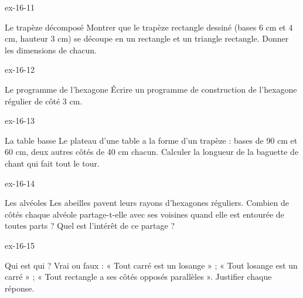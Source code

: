 \begin{blocLivre}{ex-16-11}\begin{exercice}[3]{Le trapèze décomposé}
Montrer que le trapèze rectangle dessiné (bases 6 cm et 4 cm, hauteur 3 cm) se découpe en un rectangle et un triangle rectangle. Donner les dimensions de chacun.
\label{fig-ex-16-11}
\end{exercice}\end{blocLivre}
\begin{blocLivre}{ex-16-12}\begin{exercice}[3]{Le programme de l’hexagone}
Écrire un programme de construction de l’hexagone régulier de côté 3 cm.
\label{fig-ex-16-12}
\end{exercice}\end{blocLivre}
\begin{blocLivre}{ex-16-13}\begin{exercice}[3]{La table basse}
Le plateau d’une table a la forme d’un trapèze : bases de 90 cm et 60 cm, deux autres côtés de 40 cm chacun. Calculer la longueur de la baguette de chant qui fait tout le tour.
\label{fig-ex-16-13}
\end{exercice}\end{blocLivre}
\begin{blocLivre}{ex-16-14}\begin{exercice}[3]{Les alvéoles}
Les abeilles pavent leurs rayons d’hexagones réguliers. Combien de côtés chaque alvéole partage-t-elle avec ses voisines quand elle est entourée de toutes parts ? Quel est l’intérêt de ce partage ?
\label{fig-ex-16-14}
\end{exercice}\end{blocLivre}
\begin{blocLivre}{ex-16-15}\begin{exercice}[3]{Qui est qui ?}
Vrai ou faux : « Tout carré est un losange » ; « Tout losange est un carré » ; « Tout rectangle a ses côtés opposés parallèles ». Justifier chaque réponse.
\label{fig-ex-16-15}
\end{exercice}\end{blocLivre}

\clearpage
